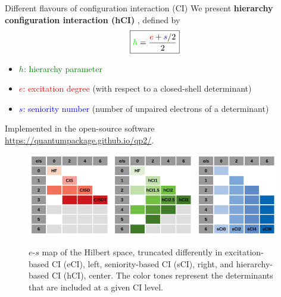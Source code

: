 \documentclass[final]{beamer}
\newcommand{\red}[1]{\textcolor{red}{#1}}
\newcommand{\blue}[1]{\textcolor{blue}{#1}}
\newcommand{\green}[1]{\textcolor{green}{#1}}
\newlength{\colwidth}
\begin{document}
\begin{frame}[t]
\begin{columns}[t]
\begin{column}{\colwidth}
\begin{block}{Different flavours of configuration interaction (CI)}
We present {\bf hierarchy configuration interaction (hCI)} \cite{Kossoski_2022}, defined by 
\begin{equation*}
  \boxed{\green{h} = \frac{\red{e} + \blue{s}/2}{2}}
\end{equation*}
\vspace{-1.5cm}
\begin{itemize}
    \item \green{$h$: hierarchy parameter}
    \item \red{$e$: excitation degree} (with respect to a closed-shell determinant)
    \item \blue{$s$: seniority number} (number of unpaired electrons of a determinant)
\end{itemize}

Implemented in the open-source software {} \cite{Garniron_2019} \\ \url{https://quantumpackage.github.io/qp2/}.
\begin{figure}
  \centering
  \includegraphics[width=0.32\textwidth]{fig/table_exc_full.pdf}
  \includegraphics[width=0.32\textwidth]{fig/table_hCI.pdf}
  \includegraphics[width=0.32\textwidth]{fig/table_sen_full.pdf}
  \caption{$e$-$s$ map of the Hilbert space, truncated differently in excitation-based CI (eCI), left, seniority-based CI (sCI), right, and hierarchy-based CI (hCI), center. The color tones represent the determinants that are included at a given CI level.}

\end{figure}
\end{block}
\end{column}
\end{columns}
\end{frame}
\end{document}
